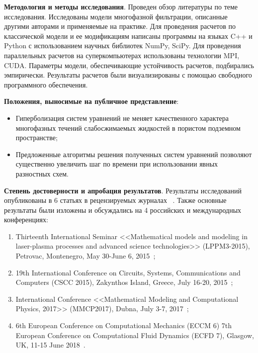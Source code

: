 \textbf{Методология и методы исследования}. Проведен обзор литературы по теме исследования. Исследованы модели многофазной фильтрации, описанные другими авторами и применяемые на практике.
Для проведения расчетов по классической модели и ее модификациям написаны программы на языках C++ и Python с использованием научных библиотек NumPy, SciPy. Для проведения параллельных расчетов на суперкомпьютерах использованы технологии MPI, CUDA.
Параметры модели, обеспечивающие устойчивость расчетов, подбирались эмпирически.
Результаты расчетов были визуализированы с помощью свободного программного обеспечения.

\textbf{Положения, выносимые на публичное представление}:
\begin{itemize}
 \item Гиперболизация систем уравнений не меняет качественного характера многофазных течений слабосжимаемых жидкостей в пористом подземном
пространстве;
 \item Предложенные алгоритмы решения полученных систем уравнений позволяют существенно увеличить шаг по времени при использовании явных разностных схем.
\end{itemize}

\textbf{Степень достоверности и апробация результатов}. Результаты исследований опубликованы в 6 статьях в рецензируемых журналах
~\citeauthor{matmod2014, matmod2015, preprint12016, preprint22016, preprint12018, preprint22018}. Также основные результаты были изложены и обсуждались на 4 российских и международных конференциях:
\begin{enumerate}
 \item Thirteenth International Seminar <<Mathematical models and modeling in laser-plasma processes and advanced science technologies>> (LPPM3-2015), Petrovac, Montenegro, May 30-June 6, 2015~\citeauthor{proc13th};
 \item 19th International Conference on Circuits, Systems, Communications and Computers (CSCC 2015), Zakynthos Island, Greece, July 16-20, 2015~\citeauthor{proc19th};
 \item International Conference <<Mathematical Modeling and Computational Physics, 2017>> (MMCP2017), Dubna, July 3-7, 2017~\citeauthor{proc2017};
 \item 6th European Conference on Computational Mechanics (ECCM 6) 7th European Conference on Computational Fluid Dynamics (ECFD 7), Glasgow, UK, 11-15 June 2018~\citeauthor{proc2018}.
\end{enumerate}
 
